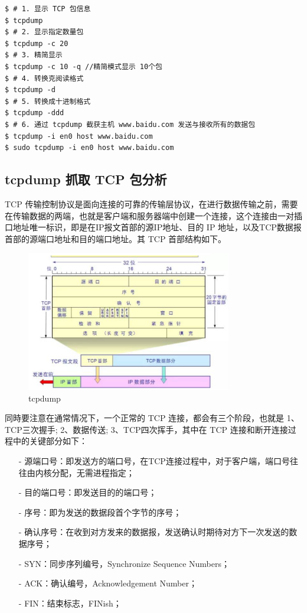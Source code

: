 \begin{Verbatim}
$ # 1. 显示 TCP 包信息
$ tcpdump
$ # 2. 显示指定数量包
$ tcpdump -c 20
$ # 3. 精简显示
$ tcpdump -c 10 -q //精简模式显示 10个包
$ # 4. 转换克阅读格式
$ tcpdump -d
$ # 5. 转换成十进制格式
$ tcpdump -ddd
$ # 6. 通过 tcpdump 截获主机 www.baidu.com 发送与接收所有的数据包
$ tcpdump -i en0 host www.baidu.com
$ sudo tcpdump -i en0 host www.baidu.com
\end{Verbatim}

\subsection{tcpdump 抓取 TCP 包分析}

TCP 传输控制协议是面向连接的可靠的传输层协议，在进行数据传输之前，需要在传输数据的两端，也就是客户端和服务器端中创建一个连接，这个连接由一对插口地址唯一标识，即是在IP报文首部的源IP地址、目的 IP 地址，以及TCP数据报首部的源端口地址和目的端口地址。其 TCP 首部结构如下。

\begin{figure}[htb]
\centering 
\includegraphics[width=0.80\textwidth]{img/newch1m2.png} 
\caption{tcpdump}
\label{Test}
\end{figure}

同時要注意在通常情况下，一个正常的 TCP 连接，都会有三个阶段，也就是 1、TCP三次握手; 2、数据传送; 3、TCP四次挥手，其中在 TCP 连接和断开连接过程中的关键部分如下：

\begin{itemize}
\item [-] 源端口号：即发送方的端口号，在TCP连接过程中，对于客户端，端口号往往由内核分配，无需进程指定；
\item [-] 目的端口号：即发送目的的端口号；
\item [-] 序号：即为发送的数据段首个字节的序号；
\item [-] 确认序号：在收到对方发来的数据报，发送确认时期待对方下一次发送的数据序号；
\item [-] SYN：同步序列编号，Synchronize Sequence Numbers；
\item [-] ACK：确认编号，Acknowledgement Number；
\item [-] FIN：结束标志，FINish；
\end{itemize}

